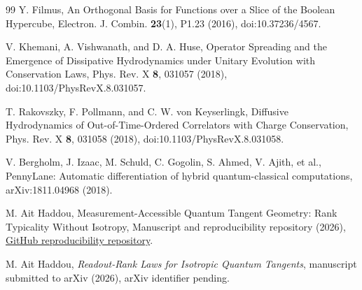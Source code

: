 \documentclass[aps,pra,reprint,superscriptaddress,nofootinbib,longbibliography]{revtex4-2}
\begin{document}
\begin{thebibliography}{99}
Y. Filmus,
An Orthogonal Basis for Functions over a Slice of the Boolean Hypercube,
Electron. J. Combin. \textbf{23}(1), P1.23 (2016),
doi:10.37236/4567.

V. Khemani, A. Vishwanath, and D. A. Huse,
Operator Spreading and the Emergence of Dissipative Hydrodynamics under Unitary Evolution with Conservation Laws,
Phys. Rev. X \textbf{8}, 031057 (2018),
doi:10.1103/PhysRevX.8.031057.

T. Rakovszky, F. Pollmann, and C. W. von Keyserlingk,
Diffusive Hydrodynamics of Out-of-Time-Ordered Correlators with Charge Conservation,
Phys. Rev. X \textbf{8}, 031058 (2018),
doi:10.1103/PhysRevX.8.031058.



V. Bergholm, J. Izaac, M. Schuld, C. Gogolin, S. Ahmed, V. Ajith, et al.,
PennyLane: Automatic differentiation of hybrid quantum-classical computations,
arXiv:1811.04968 (2018).



M. Ait Haddou,
Measurement-Accessible Quantum Tangent Geometry: Rank Typicality Without Isotropy,
Manuscript and reproducibility repository (2026),
\href{https://github.com/AHDMarwan/Spectral-Geometry-of-Accessible-Quantum-Tangents-Beyond-Isotropic-Readout-Rank-Laws}{GitHub reproducibility repository}.



M. Ait Haddou,
\textit{Readout-Rank Laws for Isotropic Quantum Tangents},
manuscript submitted to arXiv (2026), arXiv identifier pending.

\end{thebibliography}

\end{document}
